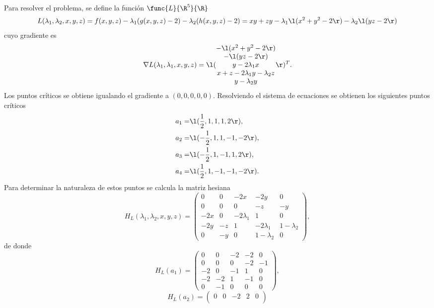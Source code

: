 \documentclass[a4,11pt]{aleph-examen}
\begin{document}
\begin{preguntas}
\begin{respuesta}
\begin{respuesta}
\begin{respuesta}
\begin{enumerate}
\begin{respuesta}
    Para resolver el problema, se define la función $\func{L}{\R^5}{\R}$
    \[
        L(\lambda_1,\lambda_2,x,y,z)=f(x,y,z)-\lambda_1(g(x,y,z)-2)-\lambda_2(h(x,y,z)-2)=xy+zy-\lambda_1 \l(x^2+y^2-2\r)-\lambda_2 \l(yz-2\r)
    \]
    cuyo gradiente es
    \[
        \nabla L(\lambda_1,\lambda_1,x,y,z)=\l( \begin{matrix} -\l(x^2+y^2-2\r)\\-\l(yz-2\r)\\y-2\lambda_1 x\\x+z-2\lambda_1 y-\lambda_2 z\\y-\lambda_2 y \end{matrix} \r)^T.
    \]
    Los puntos críticos se obtiene igualando el gradiente a $(0,0,0,0,0)$. Resolviendo el sistema de ecuaciones se obtienen los siguientes puntos críticos
    \begin{align*}
        a_1=&\l(\dfrac{1}{2},1,1,1,2\r),\\
        a_2=&\l(-\dfrac{1}{2},1,1,-1,-2\r),\\
        a_3=&\l(-\dfrac{1}{2},1,-1,1,2\r),\\
        a_4=&\l(\dfrac{1}{2},1,-1,-1,-2\r).
	\end{align*}
	Para determinar la naturaleza de estos puntos se calcula la matriz hesiana
	\[
        H_L(\lambda_1,\lambda_2, x,y,z)=
        \begin{pmatrix}
            0 & 0 & -2x & -2y & 0 \\
            0 & 0 & 0 & -z & -y \\
            -2x & 0 & -2\lambda_1 & 1 & 0 \\
            -2y & -z & 1 & -2\lambda_1 & 1-\lambda_2 \\
            0 & -y & 0 & 1-\lambda_2 & 0
        \end{pmatrix},        
    \]
    de donde
    \[
        H_L(a_1)=
        \begin{pmatrix}
            0 & 0 & -2 & -2 & 0 \\
            0 & 0 & 0 & -2 & -1 \\
            -2 & 0 & -1 & 1 & 0 \\
            -2 & -2 & 1 & -1 & 0 \\
            0 & -1 & 0 & 0 & 0
        \end{pmatrix},        
    \]
    \[
        H_L(a_2)=
        \begin{pmatrix}
            0 & 0 & -2 & 2 & 0 \\

\end{pmatrix}\]
\end{respuesta}
\end{enumerate}
\end{respuesta}
\end{respuesta}
\end{respuesta}
\end{preguntas}
\end{document}
